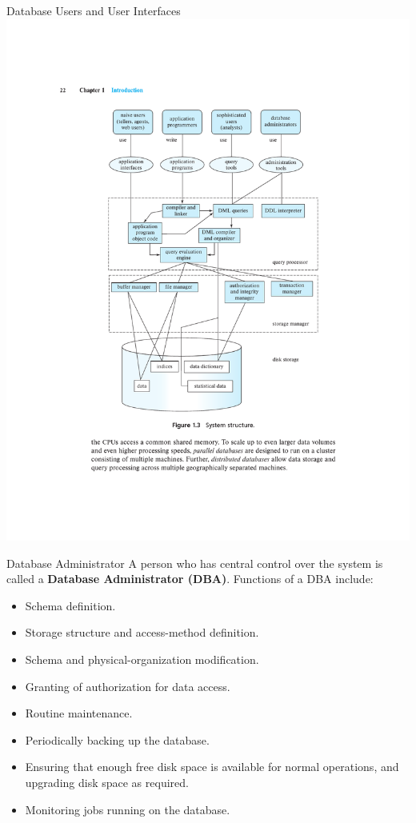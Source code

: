 \documentclass{beamer}
\begin{document}
\begin{frame}{Database Users  and User Interfaces}
    \centering 
    \includegraphics[width=0.85\textheight, trim={5.25cm 14.475cm 4.9cm 4.8cm}, clip]{figures/arch2}
\end{frame}

\begin{frame}{Database Administrator}
A person who has central control over the system is called a \textbf{Database Administrator (DBA)}.  Functions of a DBA include:
    \begin{itemize}
        \item Schema definition.
        \item Storage structure and access-method definition.
        \item Schema and physical-organization modification.
        \item Granting of authorization for data access.
        \item Routine maintenance.
        \item Periodically backing up the database.
        \item Ensuring that enough free disk space is available for normal operations, and upgrading disk space as required.
        \item Monitoring jobs running on the database.
    \end{itemize}
\end{frame}
\end{document}

